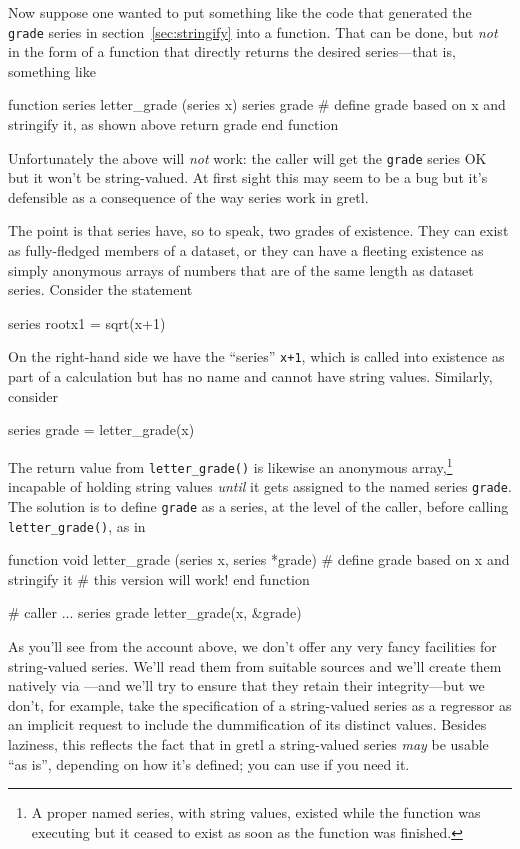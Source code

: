 Now suppose one wanted to put something like the code that generated
the \texttt{grade} series in section~\ref{sec:stringify} into a
function. That can be done, but \textit{not} in the form of a function
that directly returns the desired series---that is, something like
\begin{code}
function series letter_grade (series x)
  series grade
  # define grade based on x and stringify it, as shown above
  return grade
end function
\end{code}
%
Unfortunately the above will \emph{not} work: the caller will get the
\texttt{grade} series OK but it won't be string-valued. At first sight
this may seem to be a bug but it's defensible as a consequence of the
way series work in gretl.

The point is that series have, so to speak, two grades of
existence. They can exist as fully-fledged members of a dataset, or
they can have a fleeting existence as simply anonymous arrays of
numbers that are of the same length as dataset series. Consider the
statement
\begin{code}
series rootx1 = sqrt(x+1)
\end{code}
On the right-hand side we have the ``series'' \texttt{x+1}, which is
called into existence as part of a calculation but has no name and
cannot have string values. Similarly, consider
\begin{code}
series grade = letter_grade(x)
\end{code}
The return value from \verb|letter_grade()| is likewise an anonymous
array,\footnote{A proper named series, with string values, existed
  while the function was executing but it ceased to exist as soon as
  the function was finished.} incapable of holding string values
\textit{until} it gets assigned to the named series
\texttt{grade}. The solution is to define \texttt{grade} as a series,
at the level of the caller, before calling \verb|letter_grade()|, as
in
%
\begin{code}
function void letter_grade (series x, series *grade)
  # define grade based on x and stringify it
  # this version will work!
end function

# caller
...
series grade
letter_grade(x, &grade)
\end{code}

As you'll see from the account above, we don't offer any very fancy
facilities for string-valued series. We'll read them from suitable
sources and we'll create them natively via ---and
we'll try to ensure that they retain their integrity---but we don't,
for example, take the specification of a string-valued series as a
regressor as an implicit request to include the dummification of its
distinct values. Besides laziness, this reflects the fact that in
gretl a string-valued series \textit{may} be usable ``as is'',
depending on how it's defined; you can use  if you
need it.

